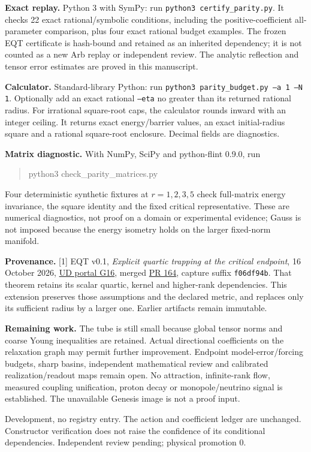 \documentclass[11pt,a4paper]{article}
\begin{document}
\textbf{Exact replay.} Python 3 with SymPy: run \texttt{python3 certify\_parity.py}. It checks 22 exact rational/symbolic conditions, including the positive-coefficient all-parameter comparison, plus four exact rational budget examples. The frozen EQT certificate is hash-bound and retained as an inherited dependency; it is not counted as a new Arb replay or independent review. The analytic reflection and tensor error estimates are proved in this manuscript.

\textbf{Calculator.} Standard-library Python: run \texttt{python3 parity\_budget.py --a 1 --N 1}. Optionally add an exact rational \texttt{--eta} no greater than its returned rational radius. For irrational square-root caps, the calculator rounds inward with an integer ceiling. It returns exact energy/barrier values, an exact initial-radius square and a rational square-root enclosure. Decimal fields are diagnostics.

\textbf{Matrix diagnostic.} With NumPy, SciPy and python-flint 0.9.0, run
\begin{quote}\ttfamily python3 check\_parity\_matrices.py\end{quote}
Four deterministic synthetic fixtures at $r=1,2,3,5$ check full-matrix energy invariance, the square identity and the fixed critical representative. These are numerical diagnostics, not proof on a domain or experimental evidence; Gauss is not imposed because the energy isometry holds on the larger fixed-norm manifold.

\textbf{Provenance.} [1] EQT v0.1, \emph{Explicit quartic trapping at the critical endpoint}, 16 October 2026, \href{https://unified-dynamics-public.ben-w-mayes.chatgpt.site/papers/\#endpoint-quartic-v01}{UD portal G16}, merged \href{https://github.com/ud-tetra/UD/pull/164}{PR 164}, capture suffix \texttt{f06df94b}. That theorem retains its scalar quartic, kernel and higher-rank dependencies. This extension preserves those assumptions and the declared metric, and replaces only its sufficient radius by a larger one. Earlier artifacts remain immutable.

\textbf{Remaining work.} The tube is still small because global tensor norms and coarse Young inequalities are retained. Actual directional coefficients on the relaxation graph may permit further improvement. Endpoint model-error/forcing budgets, sharp basins, independent mathematical review and calibrated realization/readout maps remain open. No attraction, infinite-rank flow, measured coupling unification, proton decay or monopole/neutrino signal is established. The unavailable Genesis image is not a proof input.

Development, no registry entry. The action and coefficient ledger are unchanged. Constructor verification does not raise the confidence of its conditional dependencies. Independent review pending; physical promotion $0$.
\end{document}
